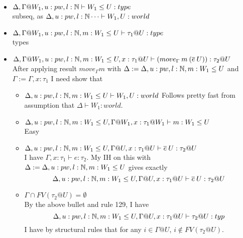 \message{ !name(paper.tex)}\documentclass{article}
\begin{document}
 \begin{itemize}
     \item $\Delta, \Gamma@W_1, u: pw, l: \N \vdash W_1 \leq U: type$\\
     subseq, as $\Delta,  u: pw, l : \mathbb{N} \dots \vdash W_1, U : world$
     \item $\Delta, \Gamma@W_1, u: pw, l : \N, m: W_1 \leq U \vdash \tau_1@U: type$\\
     types
     \item $\Delta, \Gamma@W_1, u: pw, l : \N, m: W_1 \leq U, x: \tau_1 @ U \vdash (move_{\Gamma}\:m\:(\overline{e} \: U)) : \tau_2@U$\\
     After applying result $move_{\Gamma}m$ with $\Delta := \Delta, u: pw, l: \mathbb{N}, m: W_1 \leq U$ and $\Gamma := \Gamma, x: \tau_1$
     I need show that
     \begin{itemize}
         \item $\Delta, u: pw, l: \mathbb{N}, m: W_1 \leq U \vdash W_1, U : world$
         Follows pretty fast from assumption that $\Delta \vdash W_1 : world$.
         \item $\Delta, u: pw, l: \mathbb{N}, m: W_1 \leq U, \Gamma @ W_1, x: \tau_1 @W_1 \vdash m : W_1 \leq U$\\
         Easy
         \item $\Delta, u: pw, l: \mathbb{N}, m: W_1 \leq U, \Gamma @ 
         U, x: \tau_1 @U \vdash \overline{e} \: U : \tau_2 @ U$\\
         I have $\Gamma, x: \tau_1 \vdash e : \tau_2$. My IH on this with $\Delta := \Delta, u: pw, l: \mathbb{N}, m: W_1 \leq U$ gives exactly
         \[\Delta, u: pw, l: \mathbb{N}, m: W_1 \leq U, \Gamma @ U, x: \tau_1 @U \vdash  \overline{e} \: U : \tau_2 @ U \]
         \item $\Gamma \cap FV(\tau_2 @ U) = \emptyset$\\
    By the above bullet and rule 129, I have 
    \[\Delta, u: pw, l: \mathbb{N}, m: W_1 \leq U, \Gamma @ U, x:\tau_1 @U \vdash  \tau_2 @ U: typ
    \]
         I have by structural rules that for any $i \in  \Gamma @ U$, $i \notin FV(\tau_2 @ U)$.
     \end{itemize}
 \end{itemize}
 
\end{document}
